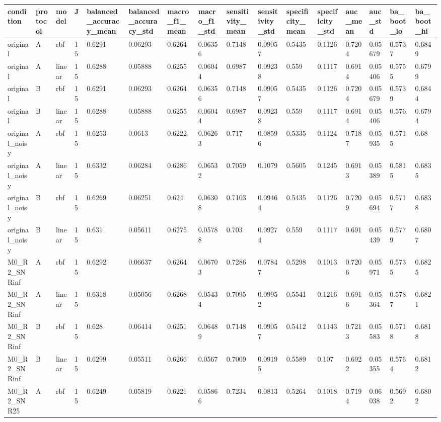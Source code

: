 \begin{tabular}{llllllllllllllll}
\hline
condition & protocol & model & J & balanced\_accuracy\_mean & balanced\_accuracy\_std & macro\_f1\_mean & macro\_f1\_std & sensitivity\_mean & sensitivity\_std & specificity\_mean & specificity\_std & auc\_mean & auc\_std & ba\_boot\_lo & ba\_boot\_hi \\
\hline
original & A & rbf & 15 & 0.6291 & 0.06293 & 0.6264 & 0.06356 & 0.7148 & 0.09057 & 0.5435 & 0.1126 & 0.7204 & 0.05679 & 0.5737 & 0.6849 \\
original & A & linear & 15 & 0.6288 & 0.05888 & 0.6255 & 0.06044 & 0.6987 & 0.09238 & 0.559 & 0.1117 & 0.6914 & 0.05406 & 0.5755 & 0.6799 \\
original & B & rbf & 15 & 0.6291 & 0.06293 & 0.6264 & 0.06356 & 0.7148 & 0.09057 & 0.5435 & 0.1126 & 0.7204 & 0.05679 & 0.5739 & 0.6844 \\
original & B & linear & 15 & 0.6288 & 0.05888 & 0.6255 & 0.06044 & 0.6987 & 0.09238 & 0.559 & 0.1117 & 0.6914 & 0.05406 & 0.576 & 0.6794 \\
original\_noisy & A & rbf & 15 & 0.6253 & 0.0613 & 0.6222 & 0.06263 & 0.717 & 0.08596 & 0.5335 & 0.1124 & 0.7187 & 0.05935 & 0.5715 & 0.68 \\
original\_noisy & A & linear & 15 & 0.6332 & 0.06284 & 0.6286 & 0.06532 & 0.7059 & 0.1079 & 0.5605 & 0.1245 & 0.6913 & 0.05389 & 0.5815 & 0.6835 \\
original\_noisy & B & rbf & 15 & 0.6269 & 0.06251 & 0.624 & 0.06308 & 0.7103 & 0.09464 & 0.5435 & 0.1126 & 0.7209 & 0.05694 & 0.5717 & 0.6838 \\
original\_noisy & B & linear & 15 & 0.631 & 0.05611 & 0.6275 & 0.05788 & 0.703 & 0.09274 & 0.559 & 0.1117 & 0.691 & 0.05439 & 0.5779 & 0.6807 \\
M0\_R2\_SNRinf & A & rbf & 15 & 0.6292 & 0.06637 & 0.6264 & 0.06703 & 0.7286 & 0.07847 & 0.5298 & 0.1013 & 0.7206 & 0.05971 & 0.5735 & 0.6825 \\
M0\_R2\_SNRinf & A & linear & 15 & 0.6318 & 0.05056 & 0.6268 & 0.05434 & 0.7095 & 0.09952 & 0.5541 & 0.1216 & 0.6916 & 0.05364 & 0.5787 & 0.6821 \\
M0\_R2\_SNRinf & B & rbf & 15 & 0.628 & 0.06414 & 0.6251 & 0.06489 & 0.7148 & 0.09057 & 0.5412 & 0.1143 & 0.7213 & 0.05583 & 0.5718 & 0.6818 \\
M0\_R2\_SNRinf & B & linear & 15 & 0.6299 & 0.05511 & 0.6266 & 0.0567 & 0.7009 & 0.09195 & 0.5589 & 0.107 & 0.6922 & 0.05355 & 0.5764 & 0.6812 \\
M0\_R2\_SNR25 & A & rbf & 15 & 0.6249 & 0.05819 & 0.6221 & 0.05866 & 0.7234 & 0.0813 & 0.5264 & 0.1018 & 0.7194 & 0.06038 & 0.5692 & 0.6802 \\

\end{tabular}
